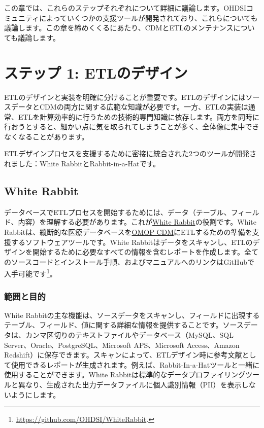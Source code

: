 \documentclass[
  11pt]{book}
\theoremstyle{definition}
\theoremstyle{definition}
\theoremstyle{definition}
\theoremstyle{definition}
\theoremstyle{remark}
\begin{document}
この章では、これらのステップそれぞれについて詳細に議論します。OHDSIコミュニティによっていくつかの支援ツールが開発されており、これらについても議論します。この章を締めくくるにあたり、CDMとETLのメンテナンスについても議論します。

\section{ステップ 1: ETLのデザイン}\label{ux30b9ux30c6ux30c3ux30d7-1-etlux306eux30c7ux30b6ux30a4ux30f3}

ETLのデザインと実装を明確に分けることが重要です。ETLのデザインにはソースデータとCDMの両方に関する広範な知識が必要です。一方、ETLの実装は通常、ETLを計算効率的に行うための技術的専門知識に依存します。両方を同時に行おうとすると、細かい点に気を取られてしまうことが多く、全体像に集中できなくなることがあります。

ETLデザインプロセスを支援するために密接に統合された2つのツールが開発されました：White RabbitとRabbit-in-a-Hatです。

\subsection{White Rabbit}\label{white-rabbit}

データベースでETLプロセスを開始するためには、データ（テーブル、フィールド、内容）を理解する必要があります。これが\href{https://github.com/OHDSI/WhiteRabbit}{White Rabbit}の役割です。White Rabbitは、縦断的な医療データベースを\href{https://github.com/OHDSI/CommonDataModel}{OMOP CDM}にETLするための準備を支援するソフトウェアツールです。White Rabbitはデータをスキャンし、ETLのデザインを開始するために必要なすべての情報を含むレポートを作成します。全てのソースコードとインストール手順、およびマニュアルへのリンクはGitHubで入手可能です\footnote{\url{https://github.com/OHDSI/WhiteRabbit}.}。 

\subsubsection*{範囲と目的}\label{ux7bc4ux56f2ux3068ux76eeux7684}

White Rabbitの主な機能は、ソースデータをスキャンし、フィールドに出現するテーブル、フィールド、値に関する詳細な情報を提供することです。ソースデータは、カンマ区切りのテキストファイルやデータベース（MySQL、SQL Server、Oracle、PostgreSQL、Microsoft APS、Microsoft Access、Amazon Redshift）に保存できます。スキャンによって、ETLデザイン時に参考文献として使用できるレポートが生成されます。例えば、Rabbit-In-a-Hatツールと一緒に使用することができます。White Rabbitは標準的なデータプロファイリングツールと異なり、生成された出力データファイルに個人識別情報（PII）を表示しないようにします。
\end{document}
